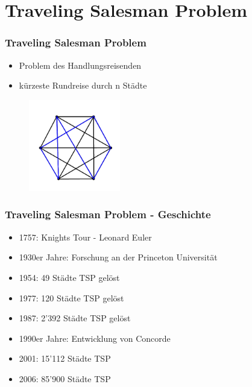 \documentclass[12pt]{beamer}
\begin{document}
    \section{Traveling Salesman Problem}
    \begin{frame}
        \frametitle{Traveling Salesman Problem}
	    \begin{itemize}
                \item Problem des Handlungsreisenden
                \item kürzeste Rundreise durch n Städte
            \end{itemize}

            \begin{figure}[H]
                \centering
                \includegraphics[width=4cm]{gfx/simple_tsp}
            \end{figure}
    \end{frame}
    \begin{frame}
        \frametitle{Traveling Salesman Problem - Geschichte}
	    \begin{itemize}
                \item 1757: Knights Tour - Leonard Euler
                \item 1930er Jahre: Forschung an der Princeton Universität
                \item 1954: 49 Städte TSP gelöst 
                \item 1977: 120 Städte TSP gelöst 
                \item 1987: 2'392 Städte TSP gelöst 
                \item 1990er Jahre: Entwicklung von Concorde
                \item 2001: 15'112 Städte TSP 
                \item 2006: 85'900 Städte TSP 
            \end{itemize}
    \end{frame}
\end{document}
